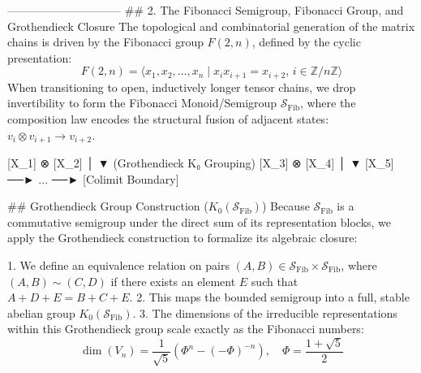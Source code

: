 ------------------------------
## 2. The Fibonacci Semigroup, Fibonacci Group, and Grothendieck Closure
The topological and combinatorial generation of the matrix chains is driven by the Fibonacci group $F(2, n)$, defined by the cyclic presentation:
$$F(2, n) = \langle x_1, x_2, \dots, x_n \mid x_i x_{i+1} = x_{i+2}, \, i \in \mathbb{Z}/n\mathbb{Z} \rangle$$ 
When transitioning to open, inductively longer tensor chains, we drop invertibility to form the Fibonacci Monoid/Semigroup $\mathcal{S}_{\text{Fib}}$, where the composition law encodes the structural fusion of adjacent states: $v_i \otimes v_{i+1} \to v_{i+2}$.

      [X_1] ⊗ [X_2]
            │
            ▼ (Grothendieck K₀ Grouping)
          [X_3] ⊗ [X_4]
                │
                ▼
              [X_5] ──► ... ──► [Colimit Boundary]

## Grothendieck Group Construction ($K_0(\mathcal{S}_{\text{Fib}})$)
Because $\mathcal{S}_{\text{Fib}}$ is a commutative semigroup under the direct sum of its representation blocks, we apply the Grothendieck construction to formalize its algebraic closure:

   1. We define an equivalence relation on pairs $(A, B) \in \mathcal{S}_{\text{Fib}} \times \mathcal{S}_{\text{Fib}}$, where $(A, B) \sim (C, D)$ if there exists an element $E$ such that $A + D + E = B + C + E$.
   2. This maps the bounded semigroup into a full, stable abelian group $K_0(\mathcal{S}_{\text{Fib}})$.
   3. The dimensions of the irreducible representations within this Grothendieck group scale exactly as the Fibonacci numbers:
   $$\dim(V_n) = \frac{1}{\sqrt{5}}\left(\Phi^n - (-\Phi)^{-n}\right), \quad \Phi = \frac{1+\sqrt{5}}{2}$$ 

